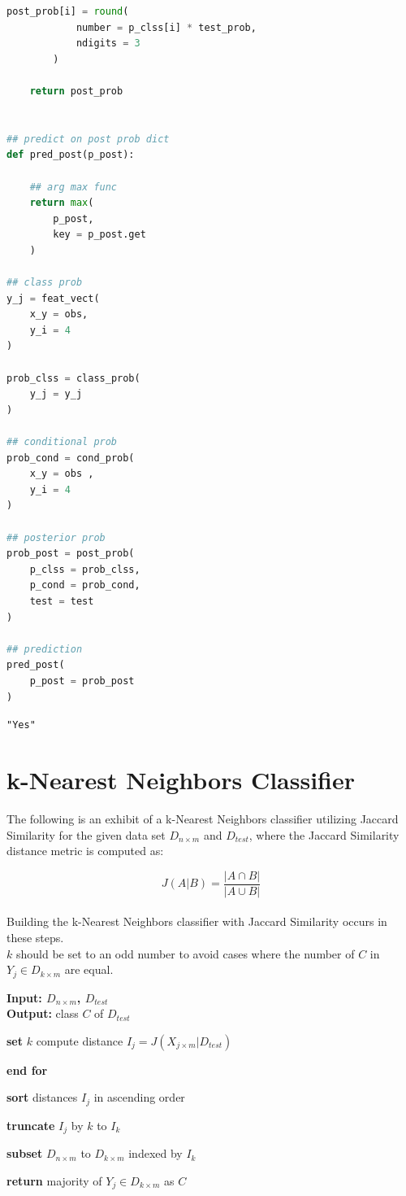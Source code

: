\documentclass{article}
\begin{document}
\begin{lstlisting}[language=Python, title=Python 3: Naive Bayes Classifier]
        post_prob[i] = round(
            number = p_clss[i] * test_prob,
            ndigits = 3
        )

    return post_prob


## predict on post prob dict
def pred_post(p_post):

    ## arg max func
    return max(
        p_post,
        key = p_post.get
    )

## class prob
y_j = feat_vect(
    x_y = obs, 
    y_i = 4
)

prob_clss = class_prob(
    y_j = y_j
)

## conditional prob
prob_cond = cond_prob(
    x_y = obs , 
    y_i = 4
)

## posterior prob
prob_post = post_prob(
    p_clss = prob_clss, 
    p_cond = prob_cond, 
    test = test
)

## prediction
pred_post(
    p_post = prob_post
)\end{lstlisting}
\verb|"Yes"|\\

\break
\section*{k-Nearest Neighbors Classifier}
The following is an exhibit of a k-Nearest Neighbors classifier utilizing Jaccard Similarity for the given data set $D_{n \times m}$ and $D_{test}$, where the Jaccard Similarity distance metric is computed as:

\begin{equation}
    J(A | B) = \frac{|A \cap B|}{|A \cup B|}
\end{equation}\\
Building the k-Nearest Neighbors classifier with Jaccard Similarity occurs in these steps.\\
$k$ should be set to an odd number to avoid cases where the number of $C$ in $Y_{j} \in D_{k \times m}$ are equal.
\begin{algorithm}
\caption{k-NN Classifier}
\textbf{Input: $D_{n \times m}$, $D_{test}$}\\
\textbf{Output:} class $C$ of $D_{test}$
\begin{algorithmic}[1]
    \item \textbf{set} $k$ 
        \STATE compute distance $I_j = J(X_{j \times m} | D_{test})$
    \item \textbf{end for}
    \item \textbf{sort} distances $I_j$ in ascending order
    \item \textbf{truncate} $I_j$ by $k$ to $I_k$
    \item \textbf{subset} $D_{n \times m}$ to $D_{k \times m}$ indexed by $I_k$
    \item \textbf{return} majority of $Y_{j} \in D_{k \times m}$ as $C$
\end{algorithmic}
\end{algorithm}
\end{document}

